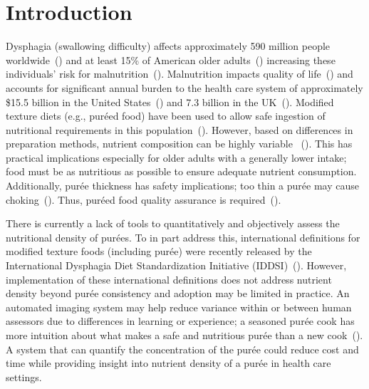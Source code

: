 \documentclass[authoryear]{elsarticle}
\begin{document}

\section{Introduction}
Dysphagia (swallowing difficulty) affects approximately 590 million people worldwide~(\cite{Cichero2016}) and at least 15\% of American older adults~(\cite{sura2012}) increasing these individuals' risk for malnutrition~(\cite{ilhamto2014,sura2012}). Malnutrition impacts quality of life~(\cite{keller2004}) and accounts for significant annual burden to the health care system of approximately \$15.5 billion in the United States~(\cite{goates2016}) and 7.3 billion in the UK~(\cite{russell2007}). Modified texture diets (e.g., pur\' eed food) have been used to allow safe ingestion of nutritional requirements in this population~(\cite{germain2006}). However, based on differences in preparation methods, nutrient composition can be highly variable ~(\cite{ilhamto2014}). This has practical implications especially for older adults with a generally lower intake; food must be as nutritious as possible to ensure adequate nutrient consumption. Additionally, pur\' ee thickness has safety implications; too thin a pur\' ee may cause choking~(\cite{ilhamto2014}). Thus, pur\' eed food quality assurance is required~(\cite{ilhamto2014}).

There is currently a lack of tools to quantitatively and objectively assess the nutritional density of pur\' ees. To in part address this, international definitions for modified texture foods (including pur\' ee) were recently released by the International Dysphagia Diet Standardization Initiative (IDDSI)~(\cite{Cichero2016}).  However, implementation of these international definitions does not address nutrient density beyond pur\' ee consistency and adoption may be limited in practice. An automated imaging system may help reduce variance within or between human assessors due to differences in learning or experience; a seasoned pur\' ee cook has more intuition about what makes a safe and nutritious pur\' ee than a new cook~(\cite{ilhamto2014}). A system that can quantify the concentration of the pur\' ee could reduce cost and time while providing insight into nutrient density of a pur\' ee in health care settings.
\end{document}
